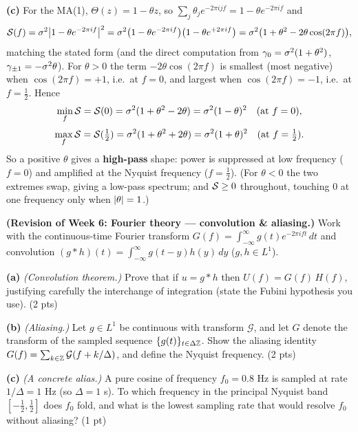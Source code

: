 \documentclass[11pt]{article}
\begin{document}
\textbf{(c)} For the MA(1), $\Theta(z)=1-\theta z$, so $\sum_j\theta_j e^{-2\pi i jf}=1-\theta e^{-2\pi i f}$ and
\[
\mathcal{S}(f)=\sigma^2\bigl|1-\theta e^{-2\pi i f}\bigr|^2
=\sigma^2\bigl(1-\theta e^{-2\pi i f}\bigr)\bigl(1-\theta e^{+2\pi i f}\bigr)
=\sigma^2\bigl(1+\theta^2-2\theta\cos(2\pi f)\bigr),
\]
matching the stated form (and the direct computation from $\gamma_0=\sigma^2(1+\theta^2)$, $\gamma_{\pm1}=-\sigma^2\theta$). For $\theta>0$ the term $-2\theta\cos(2\pi f)$ is smallest (most negative) when $\cos(2\pi f)=+1$, i.e.\ at $f=0$, and largest when $\cos(2\pi f)=-1$, i.e.\ at $f=\tfrac12$. Hence
\[
\min_f\mathcal{S}=\mathcal{S}(0)=\sigma^2(1+\theta^2-2\theta)=\sigma^2(1-\theta)^2\quad(\text{at }f=0),
\]
\[
\max_f\mathcal{S}=\mathcal{S}(\tfrac12)=\sigma^2(1+\theta^2+2\theta)=\sigma^2(1+\theta)^2\quad(\text{at }f=\tfrac12).
\]
So a positive $\theta$ gives a \textbf{high-pass} shape: power is suppressed at low frequency ($f=0$) and amplified at the Nyquist frequency ($f=\tfrac12$). (For $\theta<0$ the two extremes swap, giving a low-pass spectrum; and $\mathcal{S}\ge0$ throughout, touching $0$ at one frequency only when $\left\lvert \theta \right\rvert=1$.)

\statementstart
\textbf{(Revision of Week 6: Fourier theory --- convolution \& aliasing.)} Work with the continuous-time Fourier transform $G(f)=\int_{-\infty}^{\infty}g(t)e^{-2\pi i f t}\,dt$ and convolution $(g*h)(t)=\int_{-\infty}^{\infty}g(t-y)h(y)\,dy$ ($g,h\in L^1$).

\textbf{(a)} \emph{(Convolution theorem.)} Prove that if $u=g*h$ then $U(f)=G(f)\,H(f)$, justifying carefully the interchange of integration (state the Fubini hypothesis you use). \hfill(2 pts)

\textbf{(b)} \emph{(Aliasing.)} Let $g\in L^1$ be continuous with transform $\mathcal G$, and let $G$ denote the transform of the sampled sequence $\{g(t)\}_{t\in\Delta\mathbb{Z}}$. Show the aliasing identity $G(f)=\sum_{k\in\mathbb{Z}}\mathcal G(f+k/\Delta)$, and define the Nyquist frequency. \hfill(2 pts)

\textbf{(c)} \emph{(A concrete alias.)} A pure cosine of frequency $f_0=0.8$ Hz is sampled at rate $1/\Delta=1$ Hz (so $\Delta=1$ s). To which frequency in the principal Nyquist band $[-\tfrac12,\tfrac12]$ does $f_0$ fold, and what is the lowest sampling rate that would resolve $f_0$ without aliasing? \hfill(1 pt)
\statementend
\end{document}
